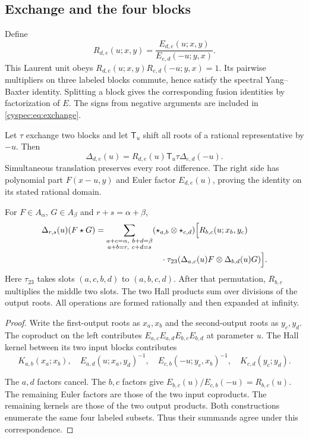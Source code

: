 \subsection{Exchange and the four blocks}

Define
\begin{equation}\label{cyspec:eq:exchange}
 R_{d,e}(u;x,y)=\frac{E_{d,e}(u;x,y)}{E_{e,d}(-u;y,x)}.
\end{equation}
This Laurent unit obeys
$R_{d,e}(u;x,y)R_{e,d}(-u;y,x)=1$.
Its pairwise multipliers on three labeled blocks commute, hence
satisfy the spectral Yang--Baxter identity. Splitting a block gives
the corresponding fusion identities by factorization of $E$.
The signs from negative arguments are included in
\eqref{cyspec:eq:exchange}.

Let $\tau$ exchange two blocks and let $\mathsf T_u$ shift all roots
of a rational representative by $-u$. Then
\begin{equation}\label{cyspec:eq:translated-exchange}
 \Delta_{d,e}(u)=R_{d,e}(u)\mathsf T_u\tau\Delta_{e,d}(-u).
\end{equation}
Simultaneous translation preserves every root difference.
The right side has polynomial part $F(x-u,y)$ and Euler factor
$E_{d,e}(u)$, proving the identity on its stated rational domain.

\begin{theorem}\label{cyspec:thm:four-block}
For $F\in A_\alpha$, $G\in A_\beta$ and $r+s=\alpha+\beta$,
\begin{equation}\label{cyspec:eq:four-block}
\begin{split}
 \Delta_{r,s}(u)(F\star G)
 =\sum_{\substack{a+c=\alpha,\ b+d=\beta\\a+b=r,\ c+d=s}}
 &(\star_{a,b}\otimes\star_{c,d})\Bigl[
 R_{b,c}(u;x_b,y_c)\\[-2pt]
 &\quad\cdot\tau_{23}
       (\Delta_{a,c}(u)F\otimes\Delta_{b,d}(u)G)\Bigr].
\end{split}
\end{equation}
Here $\tau_{23}$ takes slots $(a,c,b,d)$ to $(a,b,c,d)$.
After that permutation, $R_{b,c}$ multiplies the middle two slots.
The two Hall products sum over divisions of the output roots.
All operations are formed rationally and then expanded at infinity.
\end{theorem}

\begin{proof}
Write the first-output roots as $x_a,x_b$ and the second-output
roots as $y_c,y_d$. The coproduct on the left contributes
$E_{a,c}E_{a,d}E_{b,c}E_{b,d}$ at parameter $u$.
The Hall kernel between its two input blocks contributes
\[
 K_{a,b}(x_a;x_b),\quad E_{a,d}(u;x_a,y_d)^{-1},\quad
 E_{c,b}(-u;y_c,x_b)^{-1},\quad K_{c,d}(y_c;y_d).
\]

The $a,d$ factors cancel. The $b,c$ factors give
$E_{b,c}(u)/E_{c,b}(-u)=R_{b,c}(u)$.
The remaining Euler factors are those of the two input coproducts.
The remaining kernels are those of the two output products.
Both constructions enumerate the same four labeled subsets.
Thus their summands agree under this correspondence.
\end{proof}

